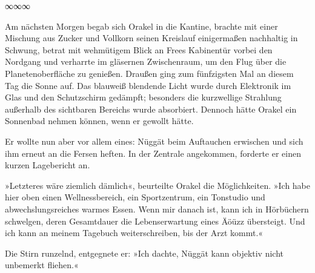 \begin{center}
∞∞∞
\end{center}

Am nächsten Morgen begab sich Orakel in die Kantine, brachte mit einer Mischung aus Zucker und Vollkorn seinen Kreislauf einigermaßen nachhaltig in Schwung, betrat mit wehmütigem Blick an Frees Kabinentür vorbei den Nordgang und verharrte im gläsernen Zwischenraum, um den Flug über die Planetenoberfläche zu genießen. Draußen ging zum fünfzigsten Mal an diesem Tag die Sonne auf. Das blauweiß blendende Licht wurde durch Elektronik im Glas und den Schutzschirm gedämpft; besonders die kurzwellige Strahlung außerhalb des sichtbaren Bereichs wurde absorbiert. Dennoch hätte Orakel ein Sonnenbad nehmen können, wenn er gewollt hätte.

Er wollte nun aber vor allem eines: Nüggät beim Auftauchen erwischen und sich ihm erneut an die Fersen heften. In der Zentrale angekommen, forderte er einen kurzen Lagebericht an.


»Letzteres wäre ziemlich dämlich«, beurteilte Orakel die Möglichkeiten. »Ich habe hier oben einen Wellnessbereich, ein Sportzentrum, ein Tonstudio und abwechslungsreiches warmes Essen. Wenn mir danach ist, kann ich in Hörbüchern schwelgen, deren Gesamtdauer die Lebenserwartung eines Äöüzz übersteigt. Und ich kann an meinem Tagebuch weiterschreiben, bis der Arzt kommt.«


Die Stirn runzelnd, entgegnete er: »Ich dachte, Nüggät kann objektiv nicht unbemerkt fliehen.«


